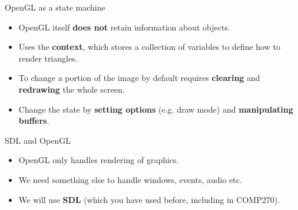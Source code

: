 \begin{frame}{OpenGL as a state machine}
	\begin{itemize}
		\pause\item OpenGL itself \textbf{does not} retain information about objects.
		\pause\item Uses the \textbf{context}, which stores a collection of variables to define how to render triangles.	
		\pause\item To change a portion of the image by default requires \textbf{clearing} and \textbf{redrawing} the whole screen.
		\pause\item Change the state by \textbf{setting options} (e.g. draw mode) and \textbf{manipulating buffers}.
	\end{itemize}
\end{frame}

\begin{frame}{SDL and OpenGL}
	\begin{itemize}
		\pause\item OpenGL only handles rendering of graphics.
		\pause\item We need something else to handle windows, events, audio etc.
		\pause\item We will use \textbf{SDL} (which you have used before, including in COMP270).
	\end{itemize}
\end{frame}

